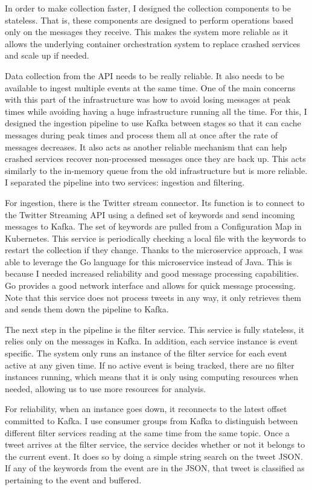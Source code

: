 In order to make collection faster, I designed the collection components to be stateless. That is, these components are designed to perform operations based only on the messages they receive. This makes the system more reliable as it allows the underlying container orchestration system to replace crashed services and scale up if needed. 

Data collection from the API needs to be really reliable. It also needs to be available to ingest multiple events at the same time. One of the main concerns with this part of the infrastructure was how to avoid losing messages at peak times while avoiding having a huge infrastructure running all the time. For this, I designed the ingestion pipeline to use Kafka between stages so that it can cache messages during peak times and process them all at once after the rate of messages decreases. It also acts as another reliable mechanism that can help crashed services recover non-processed messages once they are back up. This acts similarly to the in-memory queue from the old infrastructure but is more reliable. I separated the pipeline into two services: ingestion and filtering.

For ingestion, there is the Twitter stream connector. Its function is to connect to the Twitter Streaming API using a defined set of keywords and send incoming messages to Kafka. The set of keywords are pulled from a Configuration Map in Kubernetes. This service is periodically checking a local file with the keywords to restart the collection if they change. Thanks to the microservice approach, I was able to leverage the Go language for this microservice instead of Java. This is because I needed increased reliability and good message processing capabilities. Go provides a good network interface and allows for quick message processing. Note that this service does not process tweets in any way, it only retrieves them and sends them down the pipeline to Kafka. 

The next step in the pipeline is the filter service. This service is fully stateless, it relies only on the messages in Kafka. In addition, each service instance is event specific. The system only runs an instance of the filter service for each event active at any given time.  If no active event is being tracked, there are no filter instances running, which means that it is only using computing resources when needed, allowing us to use more resources for analysis. 

For reliability, when an instance goes down, it reconnects to the latest offset committed to Kafka. I use consumer groups from Kafka to distinguish between different filter services reading at the same time from the same topic. Once a tweet arrives at the filter service,  the service decides whether or not it belongs to the current event. It does so by doing a simple string search on the tweet JSON. If any of the keywords from the event are in the JSON, that tweet is classified as pertaining to the event and buffered. 

